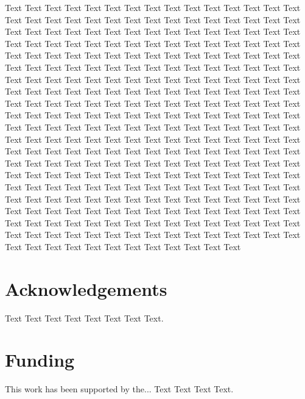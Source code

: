 \documentclass{bioinfo}
\begin{document}
Text Text Text Text Text Text  Text Text Text Text Text Text Text Text  Text Text Text Text Text Text Text Text  Text Text Text Text Text Text Text Text  Text Text Text Text Text Text Text Text  Text Text Text Text Text Text Text Text  Text Text Text Text Text Text Text Text  Text Text Text Text Text Text Text Text  Text Text Text Text Text Text Text Text  Text Text Text Text Text Text Text Text  Text Text Text Text Text Text Text Text  Text Text Text Text Text Text Text Text  Text Text Text Text Text Text Text Text  Text Text Text Text Text Text Text Text  Text Text Text Text Text Text Text Text  Text Text Text Text Text Text Text Text  Text Text Text Text Text Text Text Text  Text Text Text Text Text Text Text Text  Text Text Text Text Text Text Text Text  Text Text Text Text Text Text Text Text  Text Text Text Text Text Text Text Text  Text Text Text Text Text Text Text Text  Text Text Text Text Text Text Text Text  Text Text Text Text Text Text Text Text  Text Text Text Text Text Text Text Text  Text Text Text Text Text Text Text Text  Text Text Text Text Text Text Text Text  Text Text Text Text Text Text Text Text  Text Text Text Text Text Text Text Text  Text Text Text Text Text Text Text Text  Text Text Text Text Text Text Text Text  Text Text Text Text Text Text Text Text  Text Text Text Text Text Text Text Text  Text Text Text Text Text Text Text Text  Text Text Text Text Text Text Text Text  Text Text Text Text Text Text Text Text  Text Text Text Text Text Text Text Text  Text Text Text Text Text Text Text Text  Text Text Text Text Text Text Text Text  Text Text 
%

\enlargethispage{12pt}




\section*{Acknowledgements}

Text Text Text Text Text Text  Text Text.  
\vspace*{-12pt}

\section*{Funding}

This work has been supported by the... Text Text  Text Text.\vspace*{-12pt}


%
%
%
%
%
%

\end{document}
